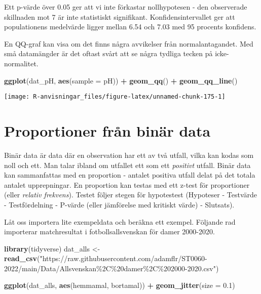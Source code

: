 \documentclass[
]{book}
\newenvironment{Shaded}{\begin{snugshade}}{\end{snugshade}}
\newcommand{\AttributeTok}[1]{\textcolor[rgb]{0.13,0.29,0.53}{#1}}
\newcommand{\FloatTok}[1]{\textcolor[rgb]{0.00,0.00,0.81}{#1}}
\newcommand{\FunctionTok}[1]{\textcolor[rgb]{0.13,0.29,0.53}{\textbf{#1}}}
\newcommand{\NormalTok}[1]{#1}
\newcommand{\OtherTok}[1]{\textcolor[rgb]{0.56,0.35,0.01}{#1}}
\newcommand{\SpecialCharTok}[1]{\textcolor[rgb]{0.81,0.36,0.00}{\textbf{#1}}}
\newcommand{\StringTok}[1]{\textcolor[rgb]{0.31,0.60,0.02}{#1}}
\theoremstyle{definition}
\theoremstyle{definition}
\theoremstyle{definition}
\theoremstyle{definition}
\theoremstyle{remark}
\begin{document}
Ett p-värde över 0.05 ger att vi inte förkastar nollhypotesen - den observerade skillnaden mot 7 är inte statistiskt signifikant. Konfidensintervallet ger att populationens medelvärde ligger mellan 6.54 och 7.03 med 95 procents konfidens.

En QQ-graf kan visa om det finns några avvikelser från normalantagandet. Med små datamängder är det oftast svårt att se några tydliga tecken på icke-normalitet.

\begin{Shaded}
\begin{Highlighting}[]
\FunctionTok{ggplot}\NormalTok{(dat\_pH, }\FunctionTok{aes}\NormalTok{(}\AttributeTok{sample =}\NormalTok{ pH)) }\SpecialCharTok{+}
  \FunctionTok{geom\_qq}\NormalTok{() }\SpecialCharTok{+}
  \FunctionTok{geom\_qq\_line}\NormalTok{()}
\end{Highlighting}
\end{Shaded}

\begin{center}\texttt{[image: R-anvisningar\_files/figure-latex/unnamed-chunk-175-1]} \end{center}

\hypertarget{proportioner-fruxe5n-binuxe4r-data}{%
\section{Proportioner från binär data}\label{proportioner-fruxe5n-binuxe4r-data}}

Binär data är data där en observation har ett av två utfall, vilka kan kodas som noll och ett. Man talar ibland om utfallet ett som ett \emph{positivt} utfall. Binär data kan sammanfattas med en proportion - antalet positiva utfall delat på det totala antalet upprepningar. En proportion kan testas med ett z-test för proportioner (eller \emph{relativ frekvens}). Testet följer stegen för hypotestest (Hypoteser - Testvärde - Testfördelning - P-värde (eller jämförelse med kritiskt värde) - Slutsats).

Låt oss importera lite exempeldata och beräkna ett exempel. Följande rad importerar matchresultat i fotbollsallsvenskan för damer 2000-2020.

\begin{Shaded}
\begin{Highlighting}[]
\FunctionTok{library}\NormalTok{(tidyverse)}
\NormalTok{dat\_alls }\OtherTok{\textless{}{-}} \FunctionTok{read\_csv}\NormalTok{(}\StringTok{"https://raw.githubusercontent.com/adamflr/ST0060{-}2022/main/Data/Allsvenskan\%2C\%20damer\%2C\%202000{-}2020.csv"}\NormalTok{)}

\FunctionTok{ggplot}\NormalTok{(dat\_alls, }\FunctionTok{aes}\NormalTok{(hemmamal, bortamal)) }\SpecialCharTok{+}
  \FunctionTok{geom\_jitter}\NormalTok{(}\AttributeTok{size =} \FloatTok{0.1}\NormalTok{)}
\end{Highlighting}
\end{Shaded}
\end{document}
